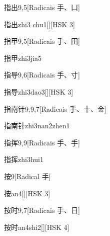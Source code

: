 \begin{entry}{指出}{9,5}[Radicais ⼿、⼐]
  \begin{phonetics}{指出}{zhi3 chu1}[][HSK 3]
  \end{phonetics}
\end{entry}

\begin{entry}{指甲}{9,5}[Radicais ⼿、⽥]
  \begin{phonetics}{指甲}{zhi3jia5}
  \end{phonetics}
\end{entry}

\begin{entry}{指导}{9,6}[Radicais ⼿、⼨]
  \begin{phonetics}{指导}{zhi3dao3}[][HSK 3]
  \end{phonetics}
\end{entry}

\begin{entry}{指南针}{9,9,7}[Radicais ⼿、⼗、⾦]
  \begin{phonetics}{指南针}{zhi3nan2zhen1}
  \end{phonetics}
\end{entry}

\begin{entry}{指挥}{9,9}[Radicais ⼿、⼿]
  \begin{phonetics}{指挥}{zhi3hui1}
  \end{phonetics}
\end{entry}

\begin{entry}{按}{9}[Radical ⼿]
  \begin{phonetics}{按}{an4}[][HSK 3]
  \end{phonetics}
\end{entry}

\begin{entry}{按时}{9,7}[Radicais ⼿、⽇]
  \begin{phonetics}{按时}{an4shi2}[][HSK 4]
  \end{phonetics}
\end{entry}

